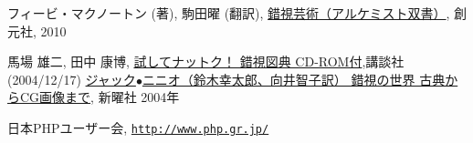 \begin{thebibliography}{99}
 フィービ・マクノートン (著), 駒田曜 (翻訳),
				 \href{http://www.amazon.co.jp/%E9%8C%AF%E8%A6%96%E8%8A%B8%E8%A1%93%EF%BC%88%E3%82%A2%E3%83%AB%E3%82%B1%E3%83%9F%E3%82%B9%E3%83%88%E5%8F%8C%E6%9B%B8%EF%BC%89-%E3%83%95%E3%82%A3%E3%83%BC%E3%83%93%E3%83%BB%E3%83%9E%E3%82%AF%E3%83%8E%E3%83%BC%E3%83%88%E3%83%B3/dp/4422214802/ref=sr_1_42?s=books&ie=UTF8&qid=1457336858&sr=1-42&keywords=%E9%8C%AF%E8%A6%96}{錯視芸術（アルケミスト双書）},
				 創元社, 2010
\iffalse
 \bibitem{Ajax}深津 貴之、増井 雄一郎、川崎 有亮、台場 圭一、WINGSプロジェクト,\\
\href{http://www.amazon.co.jp/exec/obidos/ASIN/4774125792/qid=1149342810/sr=8-2/ref=sr_8_xs_ap_i2_xgl14/249-2928731-2660351}
{Ajax 実装のための基礎テクニック}、技術評論社、2006年
 \bibitem{javascriptHacker}佐久嶋 ひろみ,
\href{http://www.amazon.co.jp/exec/obidos/search-handle-url/index=books-jp&field-keywords=javascript/ref=xs_ap_sai1_xgl14/249-2928731-2660351}{JavaScript
	ハッカーズ・プログラミング} Ajax・ブックマークレット・セキュリティ・
	アクセシビリティ・SEO, メディアテック出版 , 2005年
\fi
馬場 雄二, 田中 康博,
\href{http://www.amazon.co.jp/%E8%A9%A6%E3%81%97%E3%81%A6%E3%83%8A%E3%83%83%E3%83%88%E3%82%AF%EF%BC%81-%E9%8C%AF%E8%A6%96%E5%9B%B3%E5%85%B8-CD-ROM%E4%BB%98-%E9%A6%AC%E5%A0%B4-%E9%9B%84%E4%BA%8C/dp/4062744082/sr=1-1/qid=1167376185/ref=sr_1_1/503-0729601-8062303?ie=UTF8&s=books}
{試してナットク！ 錯視図典 CD-ROM付},講談社 (2004/12/17)
\href{http://www.amazon.co.jp/錯覚の世界—古典からCG画像まで-ジャック-ニニオ/dp/4788508885/ref=sr_1_2?ie=UTF8&s=books&qid=1206947415&sr=8-2}{ジャック$\bullet$ニニオ（鈴木幸太郎、向井智子訳）
錯視の世界 古典からCG画像まで}, 新曜社 2004年
\iffalse
 \bibitem{HTML5Guide}羽田野 太巳, 白石 俊平, 古籏 一浩 , 太田 昌吾,\\
	 \href{http://www.amazon.co.jp/Google-API-Expert%E3%81%8C%E8%A7%A3%E8%AA%AC%E3%81%99%E3%82%8BHTML5%E3%82%AC%E3%82%A4%E3%83%89%E3%83%96%E3%83%83%E3%82%AF-%E7%BE%BD%E7%94%B0%E9%87%8E-%E5%A4%AA%E5%B7%B3/dp/4844329278/ref=pd_sim_b_2}
{Google API Expertが解説するHTML5ガイドブック}, インプレスジャパン, 2010
\fi
\iffalse
 \bibitem{HTML5SmartPhone}クジラ飛行机 ,
 \href{http://www.amazon.co.jp/%E3%82%B9%E3%83%9E%E3%83%BC%E3%83%88%E3%83%95%E3%82%A9%E3%83%B3%E3%81%AE%E3%81%9F%E3%82%81%E3%81%AEHTML5%E3%82%A2%E3%83%97%E3%83%AA%E3%82%B1%E3%83%BC%E3%82%B7%E3%83%A7%E3%83%B3%E9%96%8B%E7%99%BA%E3%82%AC%E3%82%A4%E3%83%89%E2%80%95iPhone-iPad-Android%E5%AF%BE%E5%BF%9C-%E3%82%AF%E3%82%B8%E3%83%A9%E9%A3%9B%E8%A1%8C%E6%9C%BA/dp/4883377288/ref=pd_sim_b_5}
{スマートフォンのためのHTML5アプリケーション開発ガイド
				 iPhone/iPad/Android対応 }, ソシム, 2010
\fi
 日本PHPユーザー会,
				 \href{http://www.php.gr.jp/}{\texttt{http://www.php.gr.jp/}}
\iffalse
 \bibitem{AWK}A.V.エイホ , P.J.ワインバーガー , B.W.カーニハン ,
				 足立 高徳 (翻訳)
				プログラミング言語AWK, USP研究所, 2010
\fi
\end{thebibliography}

